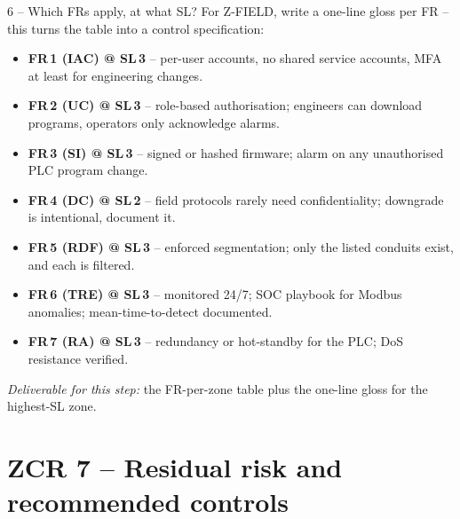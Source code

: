 \documentclass[11pt,a4paper]{article}
\begin{document}
\begin{stepbox}{6 -- Which FRs apply, at what SL?}
For Z-FIELD, write a one-line gloss per FR -- this turns the table into a control specification:
\begin{itemize}\setlength{\itemsep}{1pt}
  \item \textbf{FR\,1 (IAC) @ SL\,3} -- per-user accounts, no shared service accounts, MFA at least for engineering changes.
  \item \textbf{FR\,2 (UC) @ SL\,3} -- role-based authorisation; engineers can download programs, operators only acknowledge alarms.
  \item \textbf{FR\,3 (SI) @ SL\,3} -- signed or hashed firmware; alarm on any unauthorised PLC program change.
  \item \textbf{FR\,4 (DC) @ SL\,2} -- field protocols rarely need confidentiality; downgrade is intentional, document it.
  \item \textbf{FR\,5 (RDF) @ SL\,3} -- enforced segmentation; only the listed conduits exist, and each is filtered.
  \item \textbf{FR\,6 (TRE) @ SL\,3} -- monitored 24/7; SOC playbook for Modbus anomalies; mean-time-to-detect documented.
  \item \textbf{FR\,7 (RA) @ SL\,3} -- redundancy or hot-standby for the PLC; DoS resistance verified.
\end{itemize}

\emph{Deliverable for this step:} the FR-per-zone table plus the one-line gloss for the highest-SL zone.
\end{stepbox}

\section*{ZCR 7 -- Residual risk and recommended controls}
\end{document}
